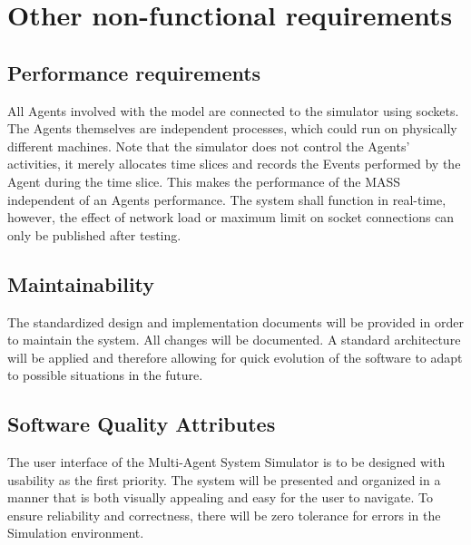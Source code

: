 \chapter{Other non-functional requirements}\label{chapter:otherFunctionalRequirements}

\section{Performance requirements}

All Agents involved with the model are connected to the simulator using sockets. The Agents themselves are independent processes, which could run on physically different machines. Note that the simulator does not control the Agents' activities, it merely allocates time slices and records the Events performed by the Agent during the time slice. This makes the performance of the MASS independent of an Agents performance. The system shall function in real-time, however, the effect of network load or maximum limit on socket connections can only be published after testing.

\section{Maintainability}

The standardized design and implementation documents will be provided in order to maintain the system. All changes will be documented. A standard architecture will be applied and therefore allowing for quick evolution of the software to adapt to possible situations in the future. 

\section{Software Quality Attributes}

The user interface of the Multi-Agent System Simulator is to be designed with usability as the first priority. The system will be presented and organized in a manner that is both visually appealing and easy for the user to navigate. To ensure reliability and correctness, there will be zero tolerance for errors in the Simulation environment. 


